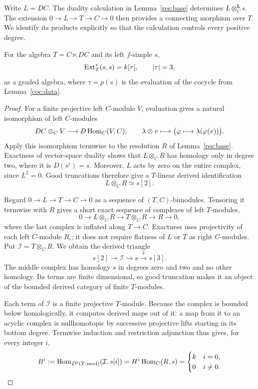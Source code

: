 Write $L=DC$. The duality calculation in Lemma~\ref{res:base} determines
$L\otimes_C^{\mathbf L}s$. The extension $0\to L\to T\to C\to0$
then provides a connecting morphism over $T$. We identify its products
explicitly so that the calculation controls every positive degree.

\begin{lemma}\label{res:polynomial}
For the algebra $T=C\ltimes DC$ and its left $f$-simple $s$,
\[
 \operatorname{Ext}_T^*(s,s)=k[\tau],\qquad |\tau|=3,
\]
as a graded algebra, where $\tau=p(s)$ is the evaluation of the cocycle
from Lemma~\ref{coc:data}.
\end{lemma}

\begin{proof}
For a finite projective left $C$-module $V$, evaluation gives a natural
isomorphism of left $C$-modules
\[
 DC\otimes_C V\longrightarrow D\operatorname{Hom}_C(V,C),\qquad
 \lambda\otimes v\longmapsto
 \bigl(\varphi\longmapsto\lambda(\varphi(v))\bigr).
\]
Apply this isomorphism termwise to the resolution $R$ of
Lemma~\ref{res:base}. Exactness of vector-space duality shows that
$L\otimes_C R$ has homology only in degree two, where it is
$D(s^{\mathrm r})=s$. Moreover, $L$ acts by zero on the entire complex,
since $L^2=0$. Good truncations therefore give a $T$-linear derived
identification
\[
 L\otimes_C R\simeq s[2].
\]

Regard $0\to L\to T\to C\to0$ as a sequence of $(T,C)$-bimodules.
Tensoring it termwise with $R$ gives a short exact sequence of complexes
of left $T$-modules,
\[
 0\longrightarrow L\otimes_C R
 \longrightarrow T\otimes_C R
 \longrightarrow R\longrightarrow0,
\]
where the last complex is inflated along $T\to C$. Exactness uses
projectivity of each left $C$-module $R_i$; it does not require flatness
of $L$ or $T$ as right $C$-modules. Put
$\mathcal I=T\otimes_C R$. We obtain the derived triangle
\begin{equation}\label{res:triangle}
 s[2]\longrightarrow\mathcal I\longrightarrow s
 \xrightarrow{\,\delta\,}s[3].
\end{equation}
The middle complex has homology $s$ in degrees zero and two and no other
homology. Its terms are finite dimensional, so good truncation makes
it an object of the bounded derived category of finite $T$-modules.

Each term of $\mathcal I$ is a finite projective $T$-module. Because the
complex is bounded below homologically, it computes derived maps out of
it: a map from it to an acyclic complex is nullhomotopic by successive
projective lifts starting in its bottom degree. Termwise induction and
restriction adjunction thus gives, for every integer $i$,
\[
 B^i:=\operatorname{Hom}_{D^b(T\text{-mod})}(\mathcal I,s[i])
 =H^i\operatorname{Hom}_C(R,s)
 =\begin{cases}k&i=0,\\0&i\ne0.\end{cases}
\]


\end{proof}
